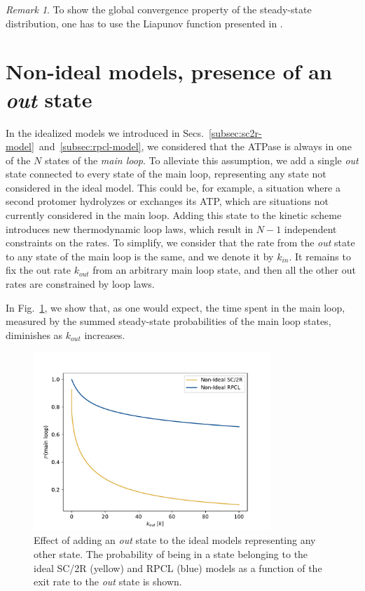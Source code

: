 \documentclass{article}
\theoremstyle{remark}
\newtheorem*{remark}{Remark}
\begin{document}
    \begin{remark}
        To show the global convergence property of the steady-state distribution, one has to use the Liapunov function presented in \cite{schnakenberg_network_1976}.
    \end{remark}

\section{Non-ideal models, presence of an \emph{out} state}
\label{app:non-ideal-model}
In the idealized models we introduced in Secs.~\ref{subsec:sc2r-model}~and~\ref{subsec:rpcl-model}, we considered that the ATPase is always in one of the $N$ states of the \emph{main loop}. To alleviate this assumption, we add a single \emph{out} state connected to every state of the main loop, representing any state not considered in the ideal model. This could be, for example, a situation where a second protomer hydrolyzes or exchanges its ATP, which are situations not currently considered in the main loop. Adding this state to the kinetic scheme introduces new thermodynamic loop laws, which result in $N-1$ independent constraints on the rates. To simplify, we consider that the rate from the \emph{out} state to any state of the main loop is the same, and we denote it by $k_{in}$. It remains to fix the out rate $k_{out}$ from an arbitrary main loop state, and then all the other out rates are constrained by loop laws.

In Fig.~\ref{fig:non-ideal}, we show that, as one would expect, the time spent in the main loop, measured by the summed steady-state probabilities of the main loop states, diminishes as $k_{out}$ increases.

\begin{figure}[h]
    \centering
    \includegraphics[width=0.8\textwidth]{images/non_ideal.pdf}
    \caption{Effect of adding an \emph{out} state to the ideal models representing any other state. The probability of being in a state belonging to the ideal SC/2R (yellow) and RPCL (blue) models as a function of the exit rate to the \emph{out} state is shown.}
    \label{fig:non-ideal}
\end{figure}
\end{document}
